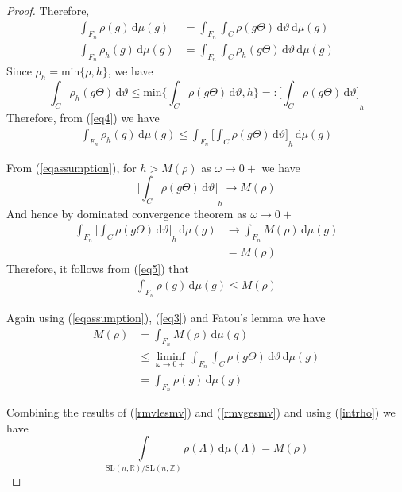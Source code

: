 \documentclass[11pt]{article}
\theoremstyle{definition}
\theoremstyle{proof}
\begin{document}
\begin{proof}
    Therefore,
    \begin{align}
        \label{eq3}
        \int_{F_n} \rho (g) \, \mathrm{d} \mu (g) &= \int_{F_n}\int_{C} \rho (g \Theta ) \, \mathrm{d} \vartheta \, \mathrm{d} \mu (g)\\
        \label{eq4}
        \int_{F_n} \rho _h(g) \, \mathrm{d} \mu (g) &= \int_{F_n}\int_{C} \rho _h(g \Theta ) \, \mathrm{d} \vartheta \, \mathrm{d} \mu (g)
    \end{align}
    Since $\rho _h = \text{min}\{\rho , h\}$, we have
    \[
        \int_{C} \rho _h(g \Theta ) \,  \mathrm{d} \vartheta \leq \text{min}\bigg\{\int_{C} \rho (g \Theta )\, \mathrm{d} \vartheta , h\bigg\} =: {\bigg[\int_{C}\rho (g \Theta )\, \mathrm{d} \vartheta \bigg]}_h
    \]
    Therefore, from (\ref{eq4}) we have
    \begin{equation}\label{eq5}
        \begin{split}
            \int_{F_n}  \rho _h(g) \, \mathrm{d} \mu (g) \leq \int_{F_n}{\bigg[\int_{C} \rho (g \Theta ) \, \mathrm{d} \vartheta \bigg]}_h \, \mathrm{d} \mu (g)
        \end{split}
    \end{equation}

    From (\ref{eqassumption}), for $h > M(\rho )$ as $\omega \to 0+$ we have
    \[
        {\bigg[\int_{C}\rho (g \Theta ) \, \mathrm{d} \vartheta \bigg]}_h  \to  M(\rho )
    \]
    And hence by dominated convergence theorem as $\omega \to 0+$
    \begin{align*}
        \int_{F_n}{\bigg[\int_{C}\rho (g \Theta ) \, \mathrm{d} \vartheta \bigg]}_h \, \mathrm{d} \mu (g)  &\to \int_{F_n} M(\rho ) \, \mathrm{d} \mu (g) \\
        &= M(\rho )
    \end{align*}
    Therefore, it follows from (\ref{eq5}) that
    \begin{align}\label{rmvlesmv}
        \int_{F_n} \rho (g) \, \mathrm{d} \mu (g) \leq M(\rho )
    \end{align}

    Again using (\ref{eqassumption}), (\ref{eq3}) and Fatou's lemma we have
    \begin{align}\label{rmvgesmv}
        M(\rho ) &= \int_{F_n} M(\rho ) \, \mathrm{d} \mu (g) \nonumber \\
        & \leq \liminf_{\omega \to 0+} \int_{F_n} \int_{C} \rho (g \Theta ) \, \mathrm{d} \vartheta \, \mathrm{d} \mu (g) \nonumber \\
        &= \int_{F_n} \rho (g) \, \mathrm{d} \mu (g)
    \end{align}

    Combining the results of (\ref{rmvlesmv}) and (\ref{rmvgesmv}) and using (\ref{intrho}) we have
    \[
        \int\limits_{\mathrm{SL}(n,\mathbb{R})/\mathrm{SL}(n,\mathbb{Z})} \rho (\Lambda ) \,  \mathrm{d} \mu (\Lambda ) = M(\rho )
    \]
\end{proof}
\end{document}
